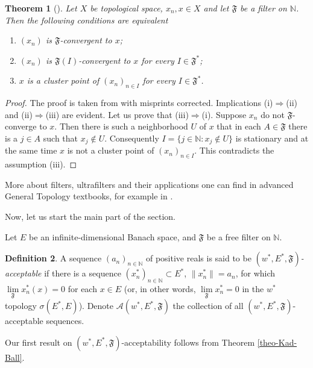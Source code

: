 \documentclass[11pt,twoside, reqno]{amsart}
\newcommand{\N}{{\mathbb N}}
\newcommand{\F}{\mathfrak{F}}
\newcommand{\flim}{\lim\limits_\F }
\theoremstyle{plain}
\newtheorem{theorem}{Theorem}[section]
\theoremstyle{remark}
\theoremstyle{definition}
\newtheorem{definition}[theorem]{Definition}
\numberwithin{equation}{section}
\begin{document}
\begin{theorem}[{\cite[Theorem 1.1]{shur}}] \label{stationary-thm} 
Let $X$ be topological space, $x_n, x \in
X$ and let $\F$ be a filter on $\N$. Then the following
conditions are equivalent

\begin{enumerate}
\item[(i)] $(x_n)$ is $\F$-convergent to $x$;

\item[(ii)] $(x_n)$ is $\F(I)$-convergent to $x$ for every $I \in
\F^*$;

\item[(iii)] $x$ is a cluster point of $(x_n)_{n \in I}$ for every $I \in
\F^*$.
\end{enumerate}
\end{theorem}
\begin{proof} The proof is taken from \cite[Theorem 1.1]{shur} with misprints corrected.
Implications (i)$\Longrightarrow$(ii)
and (ii)$\Longrightarrow$(iii) are evident. Let us
prove that (iii)$\Longrightarrow$(i). Suppose $x_n$
do not $\F$-converge to $x$. Then there is  such a neighborhood
$U$ of $x$  that in each $A\in\F$ there is a $j \in A$ such that
$x_j \not\in U$. Consequently $I=\{j \in \N: x_j \not\in U\}$ is
stationary and at the same time $x$ is not a cluster point of $(x_n)_{n \in I}$. This contradicts the assumption (iii).
\end{proof}
More about filters, ultrafilters and their applications one can find in advanced General Topology textbooks, for example in \cite{tod}.

\vspace{1 mm} 

Now, let us start the main part of the section. 

Let $E$ be an infinite-dimensional Banach space, and $\F$ be a free filter on $\N$.
\begin{definition} \label{def-w*-F-accept}
 A sequence $(a_n)_{n \in \N}$ of positive reals is said to be \emph{$(w^*, E^*, \F)$-acceptable} if there is a sequence $(x_n^*)_{n \in \N} \subset E^*$, $\|x_n^*\|=a_n$, for which $\flim  x_n^*(x)=0$ for each $x \in E$ (or, in other words, $\flim x_n^* = 0$ in the $w^*$ topology $\sigma(E^*, E)$). Denote $\mathcal A(w^*, E^*, \F)$ the collection of all $(w^*, E^*, \F)$-acceptable sequences. 
\end{definition}

Our first result on $(w^*, E^*, \F)$-acceptability follows from Theorem \ref{theo-Kad-Ball}.
\end{document}
